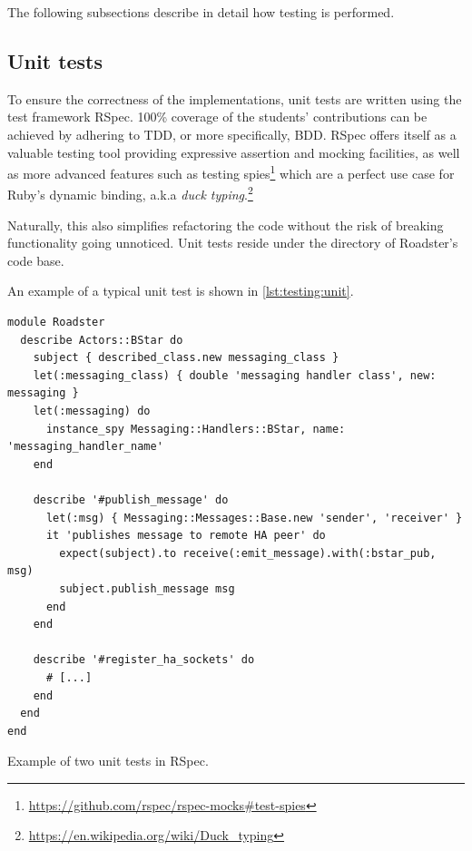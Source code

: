 The following subsections describe in detail how testing is performed.

\subsection{Unit tests}
To ensure the correctness of the implementations, unit tests are written using the test framework
RSpec. 100\% coverage of the students' contributions can be achieved by
adhering to \gls{TDD}, or more specifically, \gls{BDD}. RSpec offers itself as
a valuable testing tool providing expressive assertion and mocking
facilities, as well as more advanced features such as testing spies\footnote{\url{https://github.com/rspec/rspec-mocks\#test-spies}} which
are a perfect use case for Ruby's dynamic binding, a.k.a \emph{duck typing}.\footnote{\url{https://en.wikipedia.org/wiki/Duck_typing}}

Naturally, this also simplifies refactoring the code without the risk of
breaking functionality going unnoticed. Unit tests reside under the 
directory of Roadster's code base.

An example of a typical unit test is shown in \autoref{lst:testing:unit}.


\begin{listing}
	\begin{verbatim}
module Roadster
  describe Actors::BStar do
    subject { described_class.new messaging_class }
    let(:messaging_class) { double 'messaging handler class', new: messaging }
    let(:messaging) do
      instance_spy Messaging::Handlers::BStar, name: 'messaging_handler_name'
    end

    describe '#publish_message' do
      let(:msg) { Messaging::Messages::Base.new 'sender', 'receiver' }
      it 'publishes message to remote HA peer' do
        expect(subject).to receive(:emit_message).with(:bstar_pub, msg)
        subject.publish_message msg
      end
    end

    describe '#register_ha_sockets' do
      # [...]
    end
  end
end
	\end{verbatim}
	\caption{Example of two unit tests in RSpec.}
	\label{lst:testing:unit}
\end{listing}






